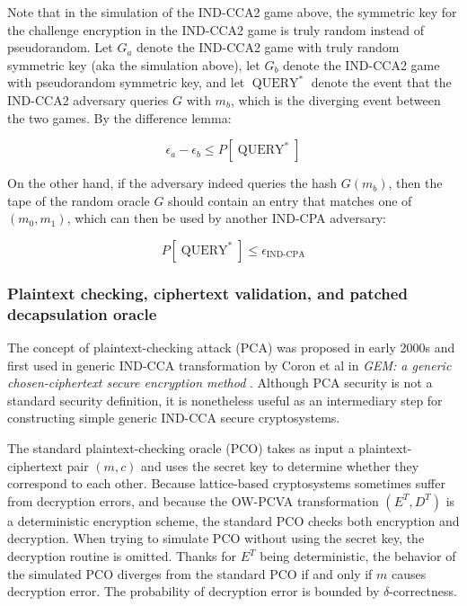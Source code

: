 \documentclass{article}
\begin{document}
Note that in the simulation of the IND-CCA2 game above, the symmetric key for the challenge encryption in the IND-CCA2 game is truly random instead of pseudorandom. Let $G_a$ denote the IND-CCA2 game with truly random symmetric key (aka the simulation above), let $G_b$ denote the IND-CCA2 game with pseudorandom symmetric key, and let $\operatorname{QUERY}^\ast$ denote the event that the IND-CCA2 adversary queries $G$ with $m_b$, which is the diverging event between the two games. By the difference lemma:

\begin{equation*}
    \epsilon_a - \epsilon_b \leq P[\operatorname{QUERY}^\ast]
\end{equation*}

On the other hand, if the adversary indeed queries the hash $G(m_b)$, then the tape of the random oracle $G$ should contain an entry that matches one of $(m_0, m_1)$, which can then be used by another IND-CPA adversary:

\begin{equation*}
    P[\operatorname{QUERY}^\ast] \leq \epsilon_\text{IND-CPA}
\end{equation*}

\subsubsection{Plaintext checking, ciphertext validation, and patched decapsulation oracle}\label{patched-decap}
The concept of plaintext-checking attack (PCA) was proposed in early 2000s and first used in generic IND-CCA transformation by Coron et al in \textit{GEM: a generic chosen-ciphertext secure encryption method} \cite{jean2002gem}. Although PCA security is not a standard security definition, it is nonetheless useful as an intermediary step for constructing simple generic IND-CCA secure cryptosystems.

The standard plaintext-checking oracle (PCO) takes as input a plaintext-ciphertext pair $(m, c)$ and uses the secret key to determine whether they correspond to each other. Because lattice-based cryptosystems sometimes suffer from decryption errors, and because the OW-PCVA transformation $(E^T, D^T)$ is a deterministic encryption scheme, the standard PCO checks both encryption and decryption. When trying to simulate PCO without using the secret key, the decryption routine is omitted. Thanks for $E^T$ being deterministic, the behavior of the simulated PCO diverges from the standard PCO if and only if $m$ causes decryption error. The probability of decryption error is bounded by $\delta$-correctness.
\end{document}
